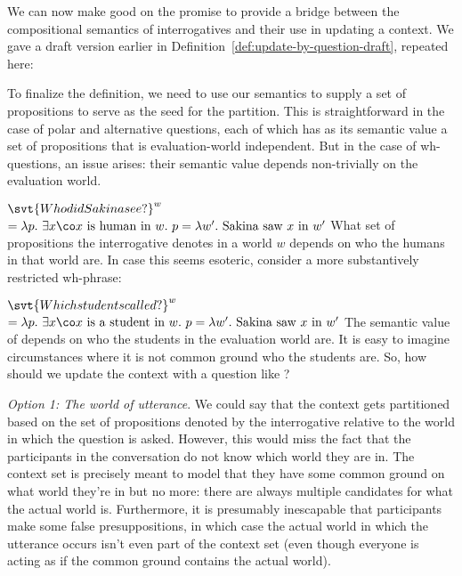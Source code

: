 We can now make good on the promise to provide a bridge between the
compositional semantics of interrogatives and their use in updating a context.
We gave a draft version earlier in
Definition~\ref{def:update-by-question-draft}, repeated here:

\updatebyquestiondraft*%

To finalize the definition, we need to use our semantics to supply a set of
propositions to serve as the seed for the partition. This is straightforward in
the case of polar and alternative questions, each of which has as its semantic
value a set of propositions that is evaluation-world independent. But in the
case of wh-questions, an issue arises: their semantic value depends
non-trivially on the evaluation world.

\ex $\svt{Who did Sakina see?}^{w}$\\
$= \lambda p.\ \exists x\co x\ \text{is human
  in}\ w.\ p = \lambda w'.\ \text{Sakina saw}\ x\ \text{in}\ w'$
\xe
%
What set of propositions the interrogative denotes in a world $w$ depends on who
the humans in that world are. In case this seems esoteric, consider a more
substantively restricted wh-phrase:

\ex $\svt{Which students called?}^{w}$\\
$= \lambda p.\ \exists x\co x\ \text{is a student
  in}\ w.\ p = \lambda w'.\ \text{Sakina saw}\ x\ \text{in}\ w'$
\xe
%
\label{par:context-uncertainty}%
The semantic value of \Last depends on who the students in the evaluation world
are. It is easy to imagine circumstances where it is not common ground who the
students are. So, how should we update the context with a question like \Last?

%
\emph{Option 1: The world of utterance}. We could say that the context gets
partitioned based on the set of propositions denoted by the interrogative
relative to the world in which the question is asked. However, this would miss
the fact that the participants in the conversation do not know which world they
are in. The context set is precisely meant to model that they have some common
ground on what world they're in but no more: there are always multiple
candidates for what the actual world is. Furthermore, it is presumably
inescapable that participants make some false presuppositions, in which case the
actual world in which the utterance occurs isn't even part of the context set
(even though everyone is acting as if the common ground contains the actual
world).

